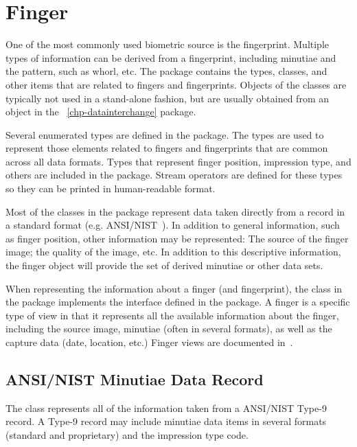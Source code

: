 %
%
\chapter{Finger}
\label{chp-finger}
One of the most commonly used biometric source is the fingerprint. Multiple
types of information can be derived from a fingerprint, including minutiae
and the pattern, such as whorl, etc. The  package contains the types,
classes, and other items that are related to fingers and fingerprints. Objects
of the  classes are typically not used in a stand-alone fashion, but are
usually obtained from an object in the ~\ref{chp-datainterchange} 
package.

Several enumerated types are defined in the  package. The types are used
to represent those elements related to fingers and fingerprints that are common
across all data formats. Types that represent finger position, impression type,
and others are included in the package. Stream operators are defined for these
types so they can be printed in human-readable format.

Most of the classes in the  package represent data taken directly from
a record in a standard format (e.g. ANSI/NIST~\cite{std:an2k}). In addition
to general information, such as finger position, other information may be
represented: The source of the finger image; the quality of the image, etc.
In addition to this descriptive information, the finger object will provide
the set of derived minutiae or other data sets.

When representing the information about a finger (and fingerprint), the class
in the  package implements the interface defined in the  package.
A finger is a specific type of view in that it represents all the available
information about the finger, including the source image, minutiae (often in
several formats), as well as the capture data (date, location, etc.)
Finger views are documented in~.

\section{ANSI/NIST Minutiae Data Record}
\label{sec-an2kminutiaedatarecord}
The  class represents all of the information taken
from a ANSI/NIST Type-9 record. A Type-9 record may include minutiae data items
in several formats (standard and proprietary) and the impression type code.
